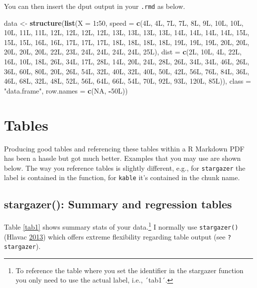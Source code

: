 \documentclass[
  12pt,
]{article}
\newenvironment{Shaded}{\begin{snugshade}}{\end{snugshade}}
\newcommand{\DataTypeTok}[1]{\textcolor[rgb]{0.13,0.29,0.53}{#1}}
\newcommand{\DecValTok}[1]{\textcolor[rgb]{0.00,0.00,0.81}{#1}}
\newcommand{\KeywordTok}[1]{\textcolor[rgb]{0.13,0.29,0.53}{\textbf{#1}}}
\newcommand{\NormalTok}[1]{#1}
\newcommand{\OperatorTok}[1]{\textcolor[rgb]{0.81,0.36,0.00}{\textbf{#1}}}
\newcommand{\OtherTok}[1]{\textcolor[rgb]{0.56,0.35,0.01}{#1}}
\newcommand{\StringTok}[1]{\textcolor[rgb]{0.31,0.60,0.02}{#1}}
\begin{document}
You can then insert the dput output in your \texttt{.rmd} as below.

\begin{Shaded}
\begin{Highlighting}[]
\NormalTok{data <-}\StringTok{ }\KeywordTok{structure}\NormalTok{(}\KeywordTok{list}\NormalTok{(}\DataTypeTok{X =} \DecValTok{1}\OperatorTok{:}\DecValTok{50}\NormalTok{, }\DataTypeTok{speed =} \KeywordTok{c}\NormalTok{(4L, 4L, 7L, 7L, 8L, 9L, 10L, }
\NormalTok{10L, 10L, 11L, 11L, 12L, 12L, 12L, 12L, 13L, 13L, 13L, 13L, 14L, }
\NormalTok{14L, 14L, 14L, 15L, 15L, 15L, 16L, 16L, 17L, 17L, 17L, 18L, 18L, }
\NormalTok{18L, 18L, 19L, 19L, 19L, 20L, 20L, 20L, 20L, 20L, 22L, 23L, 24L, }
\NormalTok{24L, 24L, 24L, 25L), }\DataTypeTok{dist =} \KeywordTok{c}\NormalTok{(2L, 10L, 4L, 22L, 16L, 10L, 18L, }
\NormalTok{26L, 34L, 17L, 28L, 14L, 20L, 24L, 28L, 26L, 34L, 34L, 46L, 26L, }
\NormalTok{36L, 60L, 80L, 20L, 26L, 54L, 32L, 40L, 32L, 40L, 50L, 42L, 56L, }
\NormalTok{76L, 84L, 36L, 46L, 68L, 32L, 48L, 52L, 56L, 64L, 66L, 54L, 70L, }
\NormalTok{92L, 93L, 120L, 85L)), }
\DataTypeTok{class =} \StringTok{"data.frame"}\NormalTok{, }\DataTypeTok{row.names =} \KeywordTok{c}\NormalTok{(}\OtherTok{NA}\NormalTok{, }
\OperatorTok{-}\NormalTok{50L))}
\end{Highlighting}
\end{Shaded}

\hypertarget{sec:tables}{%
\section{Tables}\label{sec:tables}}

Producing good tables and referencing these tables within a R Markdown PDF has been a hassle but got much better. Examples that you may use are shown below. The way you reference tables is slightly different, e.g., for \texttt{stargazer} the label is contained in the function, for \texttt{kable} it's contained in the chunk name.

\hypertarget{stargazer-summary-and-regression-tables}{%
\subsection{stargazer(): Summary and regression tables}\label{stargazer-summary-and-regression-tables}}

Table \ref{tab1} shows summary stats of your data.\footnote{To reference the table where you set the identifier in the stargazer function you only need to use the actual label, i.e., ´tab1´.} I normally use \texttt{stargazer()} (Hlavac \protect\hyperlink{ref-hlavac2013stargazer}{2013}) which offers extreme flexibility regarding table output (see \texttt{?stargazer}).
\end{document}
